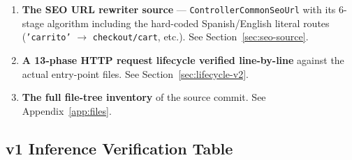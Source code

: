 \documentclass[11pt,a4paper]{article}
\begin{document}
\begin{enumerate}[leftmargin=1.6em,itemsep=2pt]
        \texttt{STORE\_ID=9} and redirects \texttt{DIR\_APPLICATION}
        to \texttt{app/shop/}. Mobile behaviour is template-swapping
        driven by \texttt{Browser::isMobile()}. See
        Section~\ref{sec:mobile}.
  \item \textbf{The SEO URL rewriter source} ---
        \texttt{ControllerCommonSeoUrl} with its 6-stage algorithm
        including the hard-coded Spanish/English literal routes
        (\texttt{'carrito'} $\to$ \texttt{checkout/cart}, etc.). See
        Section~\ref{sec:seo-source}.
  \item \textbf{A 13-phase HTTP request lifecycle verified line-by-line}
        against the actual entry-point files. See
        Section~\ref{sec:lifecycle-v2}.
  \item \textbf{The full file-tree inventory} of the source commit.
        See Appendix~\ref{app:files}.
\end{enumerate}

\subsection{v1 Inference Verification Table}\label{sec:verification}
\end{document}
